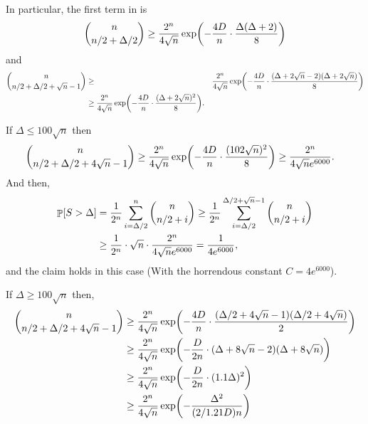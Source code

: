 {{      In particular, the first term in  is
      \begin{align*}
          \binom{n}{n/2 + \Delta/2} \geq \frac{2^n}{4\sqrt{n}} \exp
          \pth{ - \frac{4D}{n} \cdot \frac{\Delta(\Delta+2)}{8} }
      \end{align*}
      and
      \begin{align*}
          \binom{n}{n/2 + \Delta/2 + \sqrt{n} - 1} &\geq&
          \frac{2^n}{4\sqrt{n}} \exp \pth{ - \frac{4D}{n} \cdot
             \frac{(\Delta+2\sqrt{n} - 2 )(\Delta+2\sqrt{n} )}{8} }\\
          &\geq%
          \frac{2^n}{4\sqrt{n}} \exp \pth{ - \frac{4D}{n} \cdot
             \frac{(\Delta+2\sqrt{n} )^2}{8} }.
      \end{align*}

      If $\Delta \leq 100\sqrt{n}$ then
      \begin{align*}
          \binom{n}{n/2 + \Delta/2 + 4\sqrt{n} - 1} &\geq
          \frac{2^n}{4\sqrt{n}} \exp \pth{ - \frac{4D}{n} \cdot
             \frac{(102\sqrt{n} )^2}{8} } \geq \frac{2^n}{4\sqrt{n}
             e^{6000}}.
      \end{align*}
      And then,
      \begin{align*}
          \Prob{S > \Delta}%
          &=%
          \frac{1}{2^n}\sum_{i=\Delta/2}^n \binom{n}{n/2 + i} \geq
          \frac{1}{2^n}\sum_{i=\Delta/2}^{\Delta/2+\sqrt{n} -1}
          \binom{n}{n/2 + i}%
          \\&%
          \geq%
          \frac{1}{2^n} \cdot \sqrt{n} \cdot \frac{2^n}{4\sqrt{n}
             e^{6000}} = \frac{1}{4e^{6000}},
      \end{align*}
      and the claim holds in this case (With the horrendous constant
      $C = 4e^{6000}$).

      If $\Delta \geq 100\sqrt{n}$ then,
      \begin{align*}
          \binom{n}{n/2 + \Delta/2 + 4\sqrt{n} - 1} &\geq%
          \frac{2^n}{4\sqrt{n}} \exp \pth{ - \frac{4D}{n} \cdot
             \frac{(\Delta/2 + 4\sqrt{n}
                -1)(\Delta/2 + 4 \sqrt{n})}{2} }\\
          &\geq%
          \frac{2^n}{4\sqrt{n}} \exp \pth{ - \frac{D}{2n} \cdot
             (\Delta + 8\sqrt{n}
             -2)(\Delta + 8 \sqrt{n}) }\\
          &\geq%
          \frac{2^n}{4\sqrt{n}} \exp \pth{ -
             \frac{D}{2n} \cdot (1.1\Delta)^2 }\\
          &\geq%
          \frac{2^n}{4\sqrt{n}} \exp \pth{ -
             \frac{\Delta^2}{(2/1.21D)n} }\\
      \end{align*}

}}
